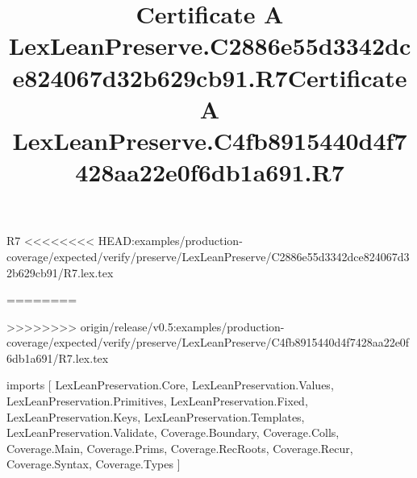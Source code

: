 \begin{lexlean}{R7}
<<<<<<<< HEAD:examples/production-coverage/expected/verify/preserve/LexLeanPreserve/C2886e55d3342dce824067d32b629cb91/R7.lex.tex
\title{Certificate A LexLeanPreserve.C2886e55d3342dce824067d32b629cb91.R7}
========
\title{Certificate A LexLeanPreserve.C4fb8915440d4f7428aa22e0f6db1a691.R7}
>>>>>>>> origin/release/v0.5:examples/production-coverage/expected/verify/preserve/LexLeanPreserve/C4fb8915440d4f7428aa22e0f6db1a691/R7.lex.tex
\begin{coremodule}
imports [
  LexLeanPreservation.Core,
  LexLeanPreservation.Values,
  LexLeanPreservation.Primitives,
  LexLeanPreservation.Fixed,
  LexLeanPreservation.Keys,
  LexLeanPreservation.Templates,
  LexLeanPreservation.Validate,
  Coverage.Boundary,
  Coverage.Colls,
  Coverage.Main,
  Coverage.Prims,
  Coverage.RecRoots,
  Coverage.Recur,
  Coverage.Syntax,
  Coverage.Types
]


\end{coremodule}
\end{lexlean}
